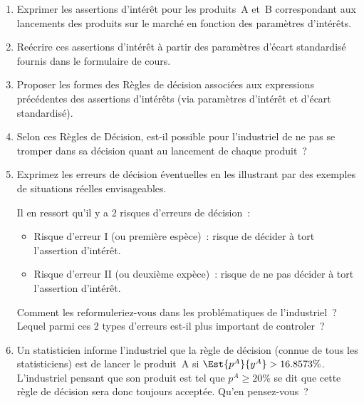 \documentclass[10pt]{report}
\begin{document}
\begin{exercice} $ $
\begin{enumerate}
\item Exprimer les assertions d'intérêt pour les produits~A et~B correspondant aux lancements des produits sur le marché en fonction des paramètres d'intérêts.
\item Reécrire ces assertions d'intérêt à partir des paramètres d'écart standardisé fournis dans le formulaire de cours.
\item Proposer les formes des Règles de décision associées aux expressions précédentes des assertions d'intérêts (via paramètres d'intérêt et d'écart standardisé).   
\item  Selon ces Règles de Décision, est-il possible pour l'industriel de ne pas se tromper dans sa décision quant au lancement de chaque produit~? 

\item Exprimez les erreurs de décision éventuelles en les illustrant par des exemples de situations réelles envisageables.

Il en ressort qu'il y a 2 risques d'erreurs de décision~: 
\begin{itemize}
\item Risque d'erreur I (ou première espèce)~: risque de décider à tort l'assertion d'intérêt.
\item Risque d'erreur II (ou deuxième expèce)~: risque de ne pas décider à tort l'assertion d'intérêt.
\end{itemize}
Comment les reformuleriez-vous dans les problématiques de l'industriel~? Lequel parmi ces 2 types d'erreurs est-il plus important de controler~?

\item Un statisticien informe l'industriel que la règle de décision (connue de tous les statisticiens) est de lancer le produit~A si $\Est{p^A}{y^A}>16.8573\%$. L'industriel pensant que son produit est tel que $p^A\geq 20\%$ se dit que cette règle de décision sera donc toujours acceptée. Qu'en pensez-vous~? 

\end{enumerate}
\end{exercice}
\end{document}
